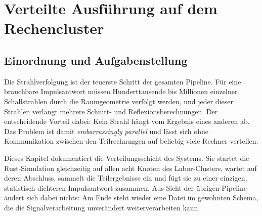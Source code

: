 %
%
%   
%   
%   


\section{Verteilte Ausführung auf dem Rechencluster}
\label{sec:cluster}

\subsection{Einordnung und Aufgabenstellung}
\label{subsec:cluster-einordnung}

Die Strahlverfolgung ist der teuerste Schritt der gesamten Pipeline. Für eine
brauchbare Impulsantwort müssen Hunderttausende bis Millionen einzelner
Schallstrahlen durch die Raumgeometrie verfolgt werden, und jeder dieser Strahlen
verlangt mehrere Schnitt- und Reflexionsberechnungen. Der entscheidende Vorteil
dabei: Kein Strahl hängt vom Ergebnis eines anderen ab. Das Problem ist damit
\emph{embarrassingly parallel} und lässt sich ohne Kommunikation zwischen den
Teilrechnungen auf beliebig viele Rechner verteilen.

Dieses Kapitel dokumentiert die Verteilungsschicht des Systems. Sie startet die
Rust-Simulation gleichzeitig auf allen acht Knoten des Labor-Clusters, wartet auf
deren Abschluss, sammelt die Teilergebnisse ein und fügt sie zu einer einzigen,
statistisch dichteren Impulsantwort zusammen. Aus Sicht der übrigen Pipeline
ändert sich dabei nichts: Am Ende steht wieder eine Datei im gewohnten Schema,
die die Signalverarbeitung unverändert weiterverarbeiten kann.

